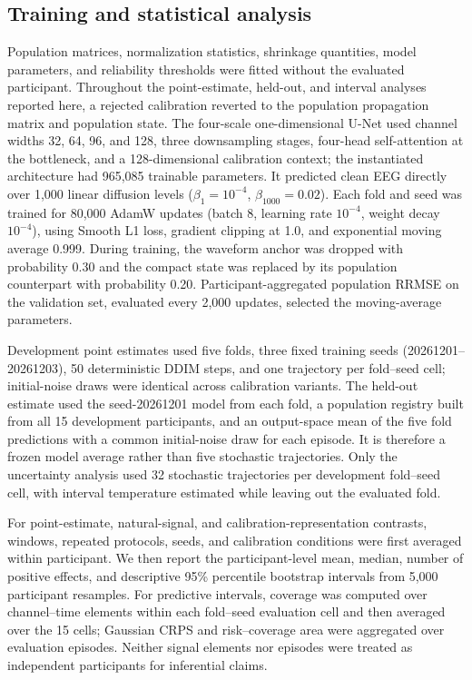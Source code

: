 \subsection{Training and statistical analysis}

Population matrices, normalization statistics, shrinkage quantities, model parameters, and reliability thresholds were fitted without the evaluated participant. Throughout the point-estimate, held-out, and interval analyses reported here, a rejected calibration reverted to the population propagation matrix and population state. The four-scale one-dimensional U-Net used channel widths 32, 64, 96, and 128, three downsampling stages, four-head self-attention at the bottleneck, and a 128-dimensional calibration context; the instantiated architecture had 965,085 trainable parameters. It predicted clean EEG directly over 1,000 linear diffusion levels ($\beta_1=10^{-4}$, $\beta_{1000}=0.02$). Each fold and seed was trained for 80,000 AdamW updates (batch 8, learning rate $10^{-4}$, weight decay $10^{-4}$), using Smooth L1 loss, gradient clipping at 1.0, and exponential moving average 0.999. During training, the waveform anchor was dropped with probability 0.30 and the compact state was replaced by its population counterpart with probability 0.20. Participant-aggregated population RRMSE on the validation set, evaluated every 2,000 updates, selected the moving-average parameters.

Development point estimates used five folds, three fixed training seeds (20261201--20261203), 50 deterministic DDIM steps, and one trajectory per fold--seed cell; initial-noise draws were identical across calibration variants. The held-out estimate used the seed-20261201 model from each fold, a population registry built from all 15 development participants, and an output-space mean of the five fold predictions with a common initial-noise draw for each episode. It is therefore a frozen model average rather than five stochastic trajectories. Only the uncertainty analysis used 32 stochastic trajectories per development fold--seed cell, with interval temperature estimated while leaving out the evaluated fold.

For point-estimate, natural-signal, and calibration-representation contrasts, windows, repeated protocols, seeds, and calibration conditions were first averaged within participant. We then report the participant-level mean, median, number of positive effects, and descriptive 95\% percentile bootstrap intervals from 5,000 participant resamples. For predictive intervals, coverage was computed over channel--time elements within each fold--seed evaluation cell and then averaged over the 15 cells; Gaussian CRPS and risk--coverage area were aggregated over evaluation episodes. Neither signal elements nor episodes were treated as independent participants for inferential claims.

